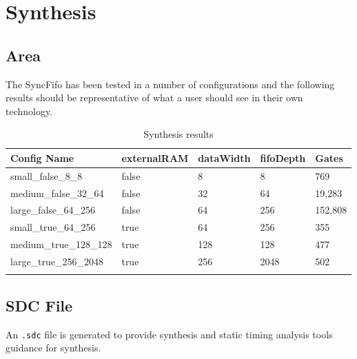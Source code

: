 \section{Synthesis}

\subsection{Area}

The SyncFifo has been tested in a number of configurations and the following
results should be representative of what a user should see in their own
technology.

\renewcommand*{\arraystretch}{1.4}
\begin{longtable}[H]{
    | p{}
    | p{}
    | p{}
    | p{}
    | p{} |
  }
  \hline
  \textbf{Config Name}   &
  \textbf{externalRAM}   &
  \textbf{dataWidth}     &
  \textbf{fifoDepth}     &
  \textbf{Gates}           \\ \hline \hline

  small\_false\_8\_8     &
  false                  &
  8                      &
  8                      &
  769                      \\ \hline

  medium\_false\_32\_64  &
  false                  &
  32                     &
  64                     &
  19,283                   \\ \hline

  large\_false\_64\_256  &
  false                  &
  64                     &
  256                    &
  152,808                  \\ \hline

  small\_true\_64\_256   &
  true                   &
  64                     &
  256                    &
  355                      \\ \hline

  medium\_true\_128\_128 &
  true                   &
  128                    &
  128                    &
  477                      \\ \hline

  large\_true\_256\_2048 &
  true                   &
  256                    &
  2048                   &
  502                      \\ \hline
  \caption{Synthesis results}\label{table:area}
\end{longtable}

\subsection{SDC File}
An \texttt{.sdc} file is generated to provide synthesis and static timing
analysis tools guidance for synthesis.

